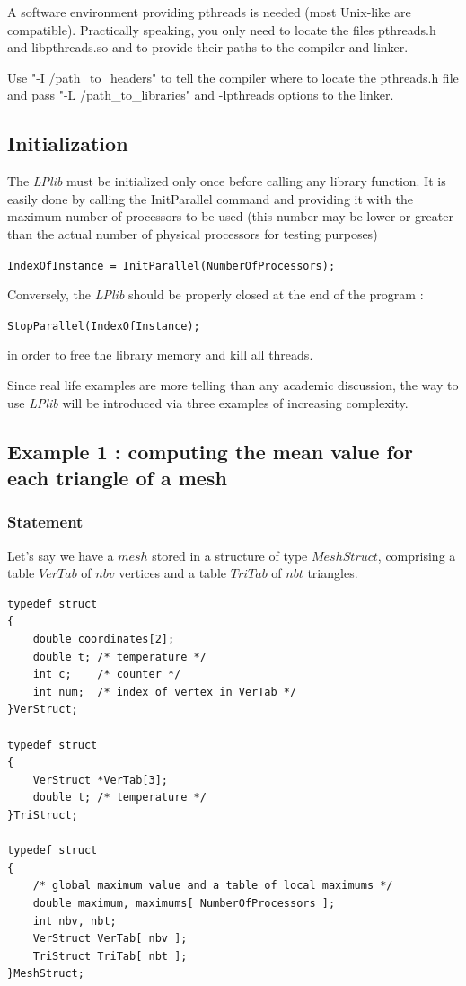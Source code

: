 \documentclass[a4paper,12pt]{article}
\begin{document}
A software environment providing pthreads is needed (most Unix-like are compatible). Practically speaking, you only need to locate the files pthreads.h and libpthreads.so and to provide their paths to the compiler and linker.

Use "-I /path\_to\_headers" to tell the compiler where to locate the pthreads.h file and pass "-L /path\_to\_libraries" and -lpthreads options to the linker.


\subsection{Initialization}

The \emph{LPlib} must be initialized only once before calling any library function. It is easily done by calling the InitParallel command and providing it with the maximum number of processors to be used (this number may be lower or greater than the actual number of physical processors for testing purposes)

\medskip
\tt{IndexOfInstance = InitParallel(NumberOfProcessors);}
\normalfont
\medskip

\noindent Conversely, the \emph{LPlib} should be properly closed at the end of the program :

\medskip
\tt{StopParallel(IndexOfInstance);}
\normalfont
\medskip

\noindent in order to free the library memory and kill all threads.

Since real life examples are more telling than any academic discussion, the way to use \emph{LPlib} will be introduced via three examples of increasing complexity.

\subsection{Example 1 : computing the mean value for each triangle of a mesh}

\subsubsection{Statement}

Let's say we have a $mesh$ stored in a structure of type $MeshStruct$, comprising a table $VerTab$ of $nbv$ vertices and a table $TriTab$ of $nbt$ triangles.

\begin{tt}
\begin{verbatim}
typedef struct
{
    double coordinates[2];
    double t; /* temperature */
    int c;    /* counter */
    int num;  /* index of vertex in VerTab */
}VerStruct;

typedef struct
{
    VerStruct *VerTab[3];
    double t; /* temperature */
}TriStruct;

typedef struct
{
    /* global maximum value and a table of local maximums */
    double maximum, maximums[ NumberOfProcessors ];
    int nbv, nbt;
    VerStruct VerTab[ nbv ];
    TriStruct TriTab[ nbt ];
}MeshStruct;
\end{verbatim}
\end{tt}
\normalfont
\end{document}
